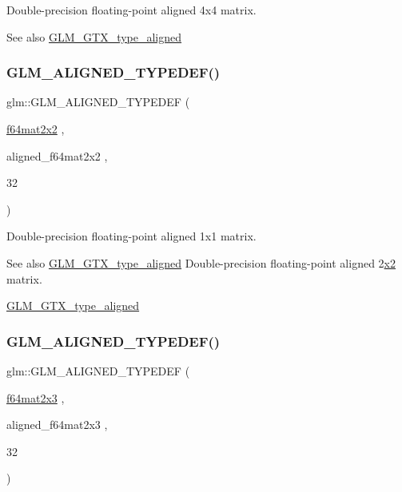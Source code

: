 Double-\/precision floating-\/point aligned 4x4 matrix. \begin{DoxySeeAlso}{See also}
\mbox{\hyperlink{group__gtx__type__aligned}{G\+L\+M\+\_\+\+G\+T\+X\+\_\+type\+\_\+aligned}} 
\end{DoxySeeAlso}
\mbox{\label{group__gtx__type__aligned_gadbd2c639c03de1c3e9591b5a39f65559}} 
\subsubsection{\texorpdfstring{GLM\_ALIGNED\_TYPEDEF()}{GLM\_ALIGNED\_TYPEDEF()}\hspace{0.1cm}{\footnotesize\ttfamily [196/209]}}
{\footnotesize\ttfamily glm\+::\+G\+L\+M\+\_\+\+A\+L\+I\+G\+N\+E\+D\+\_\+\+T\+Y\+P\+E\+D\+EF (\begin{DoxyParamCaption}\item[{\mbox{\hyperlink{group__gtc__type__precision_ga1e14d8b4e18898be51cd719fda213dcc}{f64mat2x2}}}]{,  }\item[{aligned\+\_\+f64mat2x2}]{,  }\item[{32}]{ }\end{DoxyParamCaption})}

Double-\/precision floating-\/point aligned 1x1 matrix. \begin{DoxySeeAlso}{See also}
\mbox{\hyperlink{group__gtx__type__aligned}{G\+L\+M\+\_\+\+G\+T\+X\+\_\+type\+\_\+aligned}} Double-\/precision floating-\/point aligned 2\mbox{\hyperlink{glad_8h_ad2cea6eadb01f017f0d57e7edf0ce988}{x2}} matrix. 

\mbox{\hyperlink{group__gtx__type__aligned}{G\+L\+M\+\_\+\+G\+T\+X\+\_\+type\+\_\+aligned}} 
\end{DoxySeeAlso}
\mbox{\label{group__gtx__type__aligned_gab059d7b9fe2094acc563b7223987499f}} 
\subsubsection{\texorpdfstring{GLM\_ALIGNED\_TYPEDEF()}{GLM\_ALIGNED\_TYPEDEF()}\hspace{0.1cm}{\footnotesize\ttfamily [197/209]}}
{\footnotesize\ttfamily glm\+::\+G\+L\+M\+\_\+\+A\+L\+I\+G\+N\+E\+D\+\_\+\+T\+Y\+P\+E\+D\+EF (\begin{DoxyParamCaption}\item[{\mbox{\hyperlink{group__gtc__type__precision_ga6d0196bded514d55e26e0f68dd38b37b}{f64mat2x3}}}]{,  }\item[{aligned\+\_\+f64mat2x3}]{,  }\item[{32}]{ }\end{DoxyParamCaption})}


